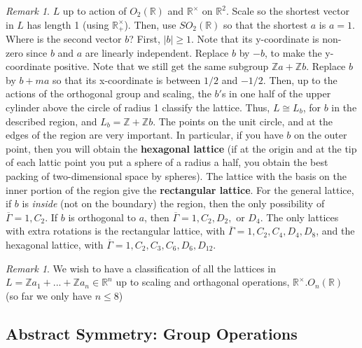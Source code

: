 \documentclass[12pt]{article}
\theoremstyle{definition}
\theoremstyle{remark}
\newtheorem{rmk}[thm]{Remark}
\numberwithin{equation}{section}
\newcommand\R{\mathbb R}    %
\newcommand\Z{\mathbb Z}    %
\newcommand\B[1]{\textbf{ #1}}
\begin{document}
\vspace{15pt}

\begin{rmk}
        $L$ up to action of $O_2(\R)$ and $\R^{\times}$ on $\R^2$. Scale so the shortest vector in $L$ has length 1 (using $\R^{\times}_+$). Then, use $SO_2(\R)$ so that the shortest $a$ is $a = 1$. Where is the second vector $b$? First, $|b| \geq 1$. Note that its y-coordinate is non-zero since $b$ and $a$ are linearly independent. Replace $b$ by $-b$, to make the y-coordinate positive. Note that we still get the same subgroup $\Z a + \Z b$. Replace $b$ by $b + ma$ so that its x-coordinate is between $1/2$ and $-1/2$. Then, up to the actions of the orthogonal group and scaling, the $b'$s in one half of the upper cylinder above the circle of radius 1 classify the lattice. Thus, $L \cong L_b$, for $b$ in the described region, and $L_b = \Z + \Z b$. The points on the unit circle, and at the edges of the region are very important. In particular, if you have $b$ on the outer point, then you will obtain the \B{hexagonal lattice} (if at the origin and at the tip of each lattic point you put a sphere of a radius a half, you obtain the best packing of two-dimensional space by spheres). The lattice with the basis on the inner portion of the region give the \B{rectangular lattice}. For the general lattice, if $b$ is \emph{inside} (not on the boundary) the region, then the only possibility of $\overline{\Gamma} = 1, C_2$. If $b$ is orthogonal to $a$, then $\overline{\Gamma} = 1, C_2, D_2,$ or $D_4$. The only lattices with extra rotations is the rectangular lattice, with $\overline{\Gamma} = 1, C_2, C_4, D_4, D_8$, and the hexagonal lattice, with $\overline{\Gamma} = 1, C_2, C_3, C_6, D_6, D_{12}$.
\end{rmk}


\vspace{15pt}

\begin{rmk}
        We wish to have a classification of all the lattices in $L = \Z a_1 + ... + \Z a_n \in \R^n$ up to scaling and orthagonal operations, $\R^{\times}.O_n(\R)$ (so far we only have $n\leq 8$)
\end{rmk}

\vspace{15pt}



\subsection{Abstract Symmetry: Group Operations}
\end{document}
